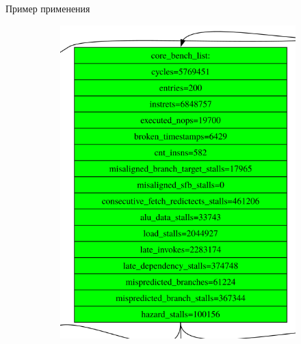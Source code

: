 \documentclass[10pt,aspectratio=169,hyperref={pdftex,unicode},xcolor=dvipsnames]{beamer}
\begin{document}
\begin{frame}{ Пример применения }
\begin{figure}
\begin{subfigure}{0.45\textwidth}
{                \includegraphics[height=0.8\textheight,keepaspectratio]{./images/stacd_functions_zoom.png}
            }
        \end{subfigure}
    \end{figure}

\end{frame}
\end{document}

